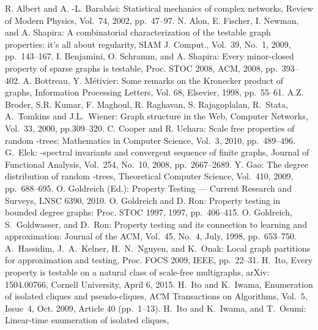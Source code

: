 \documentclass[11pt]{article}
\begin{document}
\begin{thebibliography}{99}
R. Albert and A. -L. Barab\'asi: 
Statistical mechanics of complex networks, 
Review of Modern Physics, Vol.~74, 2002, pp.~47--97.
N. Alon, E. Fischer, I. Newman, and A. Shapira:
A combinatorial characterization of the testable graph properties: it's all about regularity, 
SIAM J. Comput., Vol.~39, No.~1, 2009, pp.~143--167. 
I. Benjamini, O. Schramm, and A. Shapira: 
Every minor-closed property of sparse
graphs is testable, Proc. STOC 2008, ACM, 2008, pp.~393--402. 
A. Bottreau, Y. M\'etivier: 
Some remarks on the Kronecker product of graphs, 
Information Processing Letters, Vol. 68, Elsevier, 1998, pp.~55--61. 
A.Z. Broder, S.R. Kumar, F. Maghoul, R. Raghavan, S. Rajagoplalan, 
R.~Stata, A.~Tomkins and J.L.~Wiener: 
Graph structure in the Web, 
Computer Networks, Vol.~33, 2000, pp.309--320. 
C. Cooper and R. Uehara: 
Scale free properties of random -trees; 
Mathematics in Computer Science, Vol.~3, 2010, pp.~489--496. 
G.~Elek: 
-spectral invariants and convergent sequence of finite graphs, 
Journal of Functional Analysis, Vol.~254, No.~10, 2008, pp.~2667--2689.
Y. Gao: 
The degree distribution of random -trees, 
Theoretical Computer Science, Vol.~410, 2009, pp.~688--695. 
O. Goldreich (Ed.): 
Property Testing --- Current Research and Surveys, 
LNSC 6390, 2010. 
O. Goldreich and D. Ron: 
Property testing in bounded
degree graphs: Proc. STOC 1997, 1997, pp.~406--415.
O. Goldreich, S.~Goldwasser, and D.~Ron: 
Property testing and its connection to learning and approximation: 
Journal of the ACM, Vol.~45, No.~4, July, 1998, pp.~653--750. 
A.~Hassidim, J.~A.~Kelner, H.~N.~Nguyen, and K.~Onak:
Local graph partitions for approximation and testing, 
Proc. FOCS 2009, IEEE,  pp.~22--31.
H.~Ito, 
Every property is testable on a natural class of scale-free multigraphs, 
arXiv: 1504.00766, Cornell University, April 6, 2015.
H.~Ito and K.~Iwama, 
Enumeration of isolated cliques and pseudo-cliques, 
ACM Transactions on Algorithms, Vol.~5, Issue~4, 
Oct. 2009, Article 40 (pp.~1--13). 
H.~Ito and K.~Iwama, and T.~Osumi: 
Linear-time enumeration of isolated cliques, 

\end{thebibliography}
\end{document}
